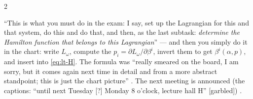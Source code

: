 \begin{paracol}{2}
\begin{coursenote}\label{cn:lt-exam}
``This is what you must do in the exam: I say, set up the Lagrangian for this and that system, do this and do that, and then, as the last subtask: \emph{determine the Hamilton function that belongs to this Lagrangian}'' --- and then you simply do it in the chart: write $L_\omega$, compute the $p_i=\partial L_\omega/\partial\beta^i$, invert them to get $\beta^i(\alpha,p)$, and insert into \eqref{eq:lt-H}. The formula was ``really smeared on the board, I am sorry, but it comes again next time in detail and from a more abstract standpoint; this is just the chart picture'' . The next meeting is announced (the captions: ``until next Tuesday [?] Monday 8 o'clock, lecture hall H'' [garbled]) .
\end{coursenote}


\end{paracol}
